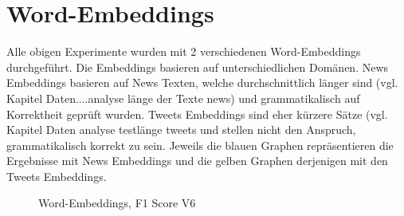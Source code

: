 \section{Word-Embeddings}
Alle obigen Experimente wurden mit 2 verschiedenen Word-Embeddings durchgeführt. Die Embeddings basieren auf unterschiedlichen Domänen.
News Embeddings basieren auf News Texten, welche durchschnittlich länger sind (vgl. Kapitel Daten....analyse länge der Texte news) und grammatikalisch auf Korrektheit geprüft wurden.
Tweets Embeddings sind eher kürzere Sätze (vgl. Kapitel Daten analyse testlänge tweets und stellen nicht den Anspruch, grammatikalisch korrekt zu sein.
Jeweils die blauen Graphen repräsentieren die Ergebnisse mit News Embeddings und die gelben Graphen derjenigen mit den Tweets Embeddings.

\begin{figure}
	\centering
	\caption{Word-Embeddings, F1 Score V6}
	\label{fig:Results V6}
\end{figure}

